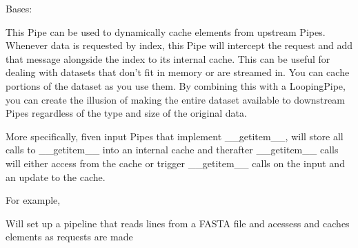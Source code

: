 \documentclass[letterpaper,10pt,english]{sphinxmanual}
\begin{document}

\begin{fulllineitems}
\label{\detokenize{Fireworks:Fireworks.toolbox.pipes.CachingPipe}}
Bases: {\hyperref[\detokenize{Fireworks:Fireworks.core.pipe.Pipe}]{}}

This Pipe can be used to dynamically cache elements from upstream Pipes.
Whenever data is requested by index, this Pipe will intercept the request and add that message alongside
the index to its internal cache.
This can be useful for dealing with datasets that don’t fit in memory or are streamed in. You can cache portions
of the dataset as you use them. By combining this with a LoopingPipe, you can create the illusion of making
the entire dataset available to downstream Pipes regardless of the type and size of the original data.

More specifically, fiven input Pipes that implement \_\_getitem\_\_, will store all calls to \_\_getitem\_\_ into
an internal cache and therafter \_\_getitem\_\_ calls will either access from the cache or trigger \_\_getitem\_\_ calls
on the input and an update to the cache.

For example,

%
\begin{sphinxVerbatim}[commandchars=\\\{\}]
  
  
    
\end{sphinxVerbatim}

Will set up a pipeline that reads lines from a FASTA file and acessess and caches elements as requests are made


\end{fulllineitems}
\end{document}
